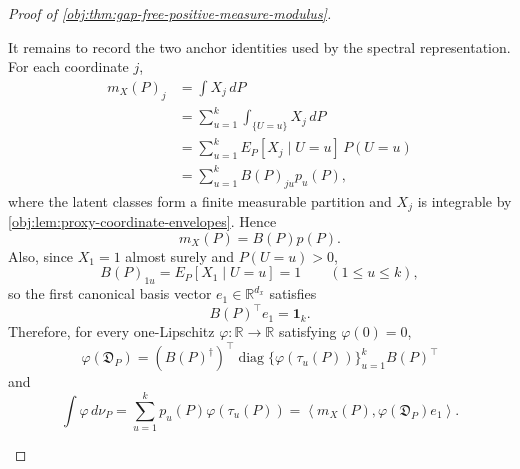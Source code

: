 \begin{proof}[Proof of \cref{obj:thm:gap-free-positive-measure-modulus}]
\begin{enumerate}
It remains to record the two anchor identities used by the spectral representation.  For each coordinate \(j\),
\[
\begin{aligned}
m_X(P)_j
&=\int X_j\,dP\\
&=\sum_{u=1}^k\int_{\{U=u\}}X_j\,dP\\
&=\sum_{u=1}^k E_P[X_j\mid U=u]\,P(U=u)\\
&=\sum_{u=1}^k B(P)_{ju}p_u(P),
\end{aligned}
\]
where the latent classes form a finite measurable partition and \(X_j\) is integrable by \cref{obj:lem:proxy-coordinate-envelopes}.  Hence
\[
m_X(P)=B(P)p(P).
\]
Also, since \(X_1=1\) almost surely and \(P(U=u)>0\),
\[
B(P)_{1u}=E_P[X_1\mid U=u]=1
\qquad(1\le u\le k),
\]
so the first canonical basis vector \(e_1\in\mathbb R^{d_x}\) satisfies
\[
B(P)^\top e_1=\mathbf 1_k .
\]
Therefore, for every one-Lipschitz \(\varphi:\mathbb R\to\mathbb R\) satisfying
\(\varphi(0)=0\),
\[
\varphi(\mathfrak D_P)
=
(B(P)^\dagger)^\top
\operatorname{diag}\{\varphi(\tau_u(P))\}_{u=1}^kB(P)^\top
\]
and
\[
\int \varphi\,d\nu_P
=
\sum_{u=1}^kp_u(P)\varphi(\tau_u(P))
=
\left\langle m_X(P),\varphi(\mathfrak D_P)e_1\right\rangle .
\]


\end{enumerate}
\end{proof}
